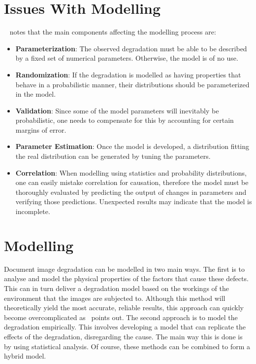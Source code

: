 \documentclass[a4paper, 12pt]{report}
\begin{document}
\section{Issues With Modelling}
~\cite{Baird2007} notes that the main components affecting the modelling process are:
\begin{itemize}
    \item \textbf{Parameterization}: The observed degradation must be able to be described by a fixed set of numerical parameters. Otherwise, the model is of no use.
    \item \textbf{Randomization}: If the degradation is modelled as having properties that behave in a probabilistic manner, their distributions should be parameterized in the model.
    \item \textbf{Validation}: Since some of the model parameters will inevitably be probabilistic, one needs to compensate for this by accounting for certain margins of error.
    \item \textbf{Parameter Estimation}: Once the model is developed, a distribution fitting the real distribution can be generated by tuning the parameters.
    \item \textbf{Correlation}: When modelling using statistics and probability distributions, one can easily mistake correlation for causation, therefore the model must be thoroughly evaluated by predicting the output of changes in parameters and verifying those predictions. Unexpected results may indicate that the model is incomplete.
\end{itemize}

\section{Modelling}
Document image degradation can be modelled in two main ways. The first is to
analyse and model the physical properties of the factors that cause these
defects. This can in turn deliver a degradation model based on the workings of
the environment that the images are subjected to. Although this method will
theoretically yield the most accurate, reliable results, this approach can
quickly become overcomplicated as~\cite{Baird2007} points out. The second
approach is to model the degradation empirically. This involves developing a
model that can replicate the effects of the degradation, disregarding the
cause. The main way this is done is by using statistical analysis. Of course,
these methods can be combined to form a hybrid model.
\end{document}
